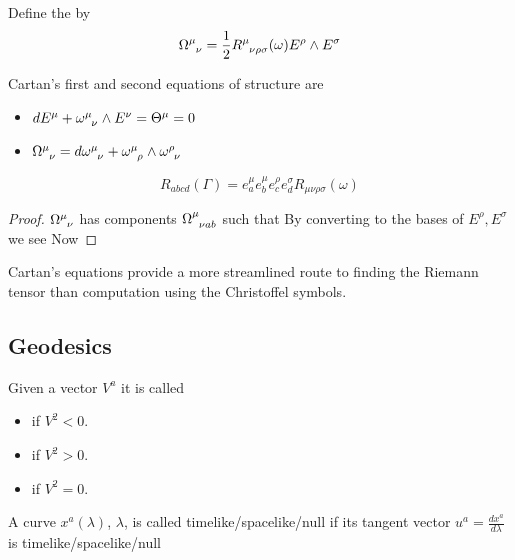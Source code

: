 \documentclass{article}
\begin{document}
\begin{definition}
Define the  by 
\[
\Omega\indices{^\mu_\nu} = \frac{1}{2} R\indices{^\mu_\nu_\rho_\sigma}(\omega) E^\rho \wedge E^\sigma
\]
\end{definition}

\begin{theorem}
Cartan's first and second equations of structure are 
\begin{itemize}
    \item $dE^\mu +  \omega\indices{^\mu_\nu} \wedge E^\nu = \Theta^\mu = 0 $ 
    \item $\Omega\indices{^\mu_\nu} = d\omega\indices{^\mu_\nu} +  \omega\indices{^\mu_\rho} \wedge  \omega\indices{^\rho_\nu}$
\end{itemize}
\end{theorem}

\begin{theorem}
\[
R_{abcd}(\Gamma) = e^\mu_a e^\mu_b e^\rho_c e^\sigma_d R_{\mu\nu\rho\sigma}(\omega)
\]
\end{theorem}
\begin{proof}
$\Omega\indices{^\mu_\nu}$ has components $\Omega\indices{^\mu_\nu_a_b}$ such that 
By converting to the bases of $E^\rho,E^\sigma$ we see 
Now 
\end{proof}

\begin{idea}
Cartan's equations provide a more streamlined route to finding the Riemann tensor than computation using the Christoffel symbols. 
\end{idea}

\subsection{Geodesics}

\begin{definition}
Given a vector $V^a$ it is called 
\begin{itemize}
\item {} if $V^2 < 0$.
\item {} if $V^2 > 0$.
\item {} if $V^2 = 0$.
\end{itemize}
A curve $x^a(\lambda)$, $\lambda$, is called timelike/spacelike/null if its tangent vector $u^a = \frac{dx^a}{d\lambda}$ is timelike/spacelike/null
\end{definition}
\end{document}
